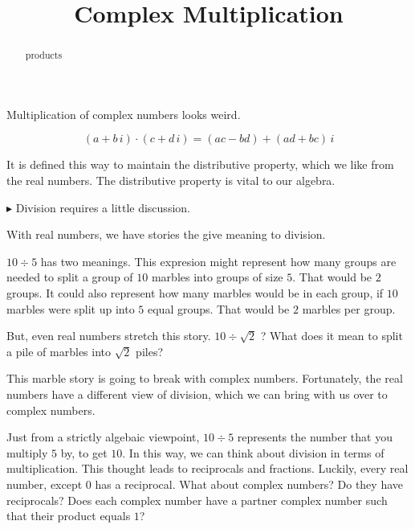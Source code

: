 \documentclass{ximera}
\title{Complex Multiplication}
\begin{document}
\begin{abstract}
products
\end{abstract}
\maketitle


Multiplication of complex numbers looks weird.





\begin{definition}


\[    (a + b \, i) \cdot (c + d \, i) = (ac-bd) + (ad+bc) \, i           \]

\end{definition}


It is defined this way to maintain the distributive property, which we like from the real numbers.  The distributive property is vital to our algebra.



$\blacktriangleright$ Division requires a little discussion.



With real numbers, we have stories the give meaning to division.


$10 \div 5$ has two meanings.  This expresion might represent how many groups are needed to split a group of $10$ marbles into groups of size $5$.  That would be $2$ groups.  It could also represent how many marbles would be in each group, if $10$ marbles were split up into $5$ equal groups.  That would be $2$ marbles per group.


But, even real numbers stretch this story.  $10 \div \sqrt{2}$ ?  What does it mean to split a pile of marbles into $\sqrt{2}$ piles?

This marble story is going to break with complex numbers.  Fortunately, the real numbers have a different view of division, which we can bring with us over to complex numbers.





Just from a strictly algebaic viewpoint, $10 \div 5$ represents the number that you multiply $5$ by, to get $10$.  In this way, we can think about division in terms of multiplication.  This thought leads to reciprocals and fractions.  Luckily, every real number, except $0$ has a reciprocal.  What about complex numbers?  Do they have reciprocals?  Does each complex number have a partner complex number such that their product equals $1$?
\end{document}

